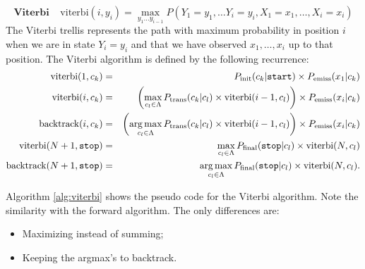 \begin{equation}
\label{eq::viterbi}
\mathbf{Viterbi }\;\;\;\;  \mathrm{viterbi}(i, y_i) = \max_{y_1...y_{i-1}} P(Y_1=y_1,\ldots Y_i = y_i , X_1=x_1,\ldots, X_i=x_i)
\end{equation}
The Viterbi trellis represents the path with maximum probability in
position
$i$ when we are in state $Y_i=y_i$ and that we have observed $x_1,\ldots,x_i$
up to that position. The Viterbi algorithm is defined by the
following recurrence: 
\begin{eqnarray}
\mathrm{viterbi}(1, c_k) &=& P_{\mathrm{init}}(c_k|\text{\tt start}) \times 
P_{\mathrm{emiss}}(x_1 | c_k)
 \\
 \mathrm{viterbi}(i, c_k) &=& \left( \displaystyle \max_{c_l \in \Lambda} P_{\mathrm{trans}}(c_k | c_l) \times \mathrm{viterbi}(i-1, c_l) \right) \times P_{\mathrm{emiss}}(x_i | c_k)  \label{viterbiRecursion}
 \\
 \mathrm{backtrack}(i, c_k) &=& \left( \displaystyle \operatorname*{arg\,max}_{c_l \in \Lambda} P_{\mathrm{trans}}(c_k | c_l) \times \mathrm{viterbi}(i-1, c_l) \right) \times P_{\mathrm{emiss}}(x_i | c_k) 
 \\
  \mathrm{viterbi}(N+1, \text{\tt stop}) &=& \max_{c_l \in \Lambda} P_{\mathrm{final}}(\text{\tt stop} | c_l) \times \mathrm{viterbi}(N, c_l)
 \\
  \mathrm{backtrack}(N+1, \text{\tt stop}) &=& \operatorname*{arg\,max}_{c_l \in \Lambda} P_{\mathrm{final}}(\text{\tt stop} | c_l) \times \mathrm{viterbi}(N, c_l).
\end{eqnarray}



Algorithm \ref{alg:viterbi} shows the pseudo code for the Viterbi algorithm.
Note the similarity with the forward algorithm.
The only differences are:
\begin{itemize}
\item Maximizing instead of summing;
\item Keeping the argmax's to backtrack.
\end{itemize}


